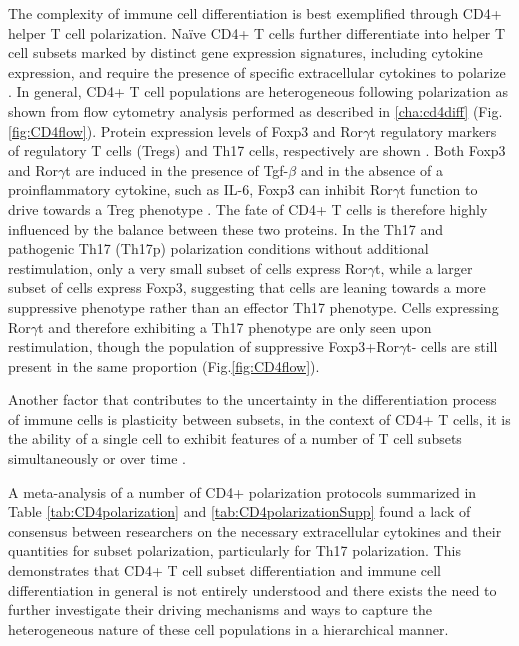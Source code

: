 The complexity of immune cell differentiation is best exemplified through CD4+ helper T cell polarization. Naïve CD4+ T cells further differentiate into helper T cell subsets marked by distinct gene expression signatures, including cytokine expression, and require the presence of specific extracellular cytokines to polarize \cite{Zhang_2012}. In general, CD4+ T cell populations are heterogeneous following polarization as shown from flow cytometry analysis performed as described in \ref{cha:cd4diff} (Fig. \ref{fig:CD4flow}). Protein expression levels of Foxp3 and Ror$\gamma$t \textemdash regulatory markers of regulatory T cells (Tregs) and Th17 cells, respectively \textemdash are shown \cite{Rudensky_2011, Ivanov_2006}. Both Foxp3 and Ror$\gamma$t are induced in the presence of Tgf-$\beta$ and in the absence of a proinflammatory cytokine, such as IL-6, Foxp3 can inhibit Ror$\gamma$t function to drive towards a Treg phenotype \cite{Ziegler_2009}. The fate of CD4+ T cells is therefore highly influenced by the balance between these two proteins. In the Th17 and pathogenic Th17 (Th17p) polarization conditions without additional restimulation, only a very small subset of cells express Ror$\gamma$t, while a larger subset of cells express Foxp3, suggesting that cells are leaning towards a more suppressive phenotype rather than an effector Th17 phenotype. Cells expressing Ror$\gamma$t and therefore exhibiting a Th17 phenotype are only seen upon restimulation, though the population of suppressive Foxp3+Ror$\gamma$t- cells are still present in the same proportion (Fig.\ref{fig:CD4flow}).

Another factor that contributes to the uncertainty in the differentiation process of immune cells is plasticity between subsets, in the context of CD4+ T cells, it is the ability of a single cell to exhibit features of a number of T cell subsets simultaneously or over time \cite{Geginat_2014}.

A meta-analysis of a number of CD4+ polarization protocols summarized in Table \ref{tab:CD4polarization} and \ref{tab:CD4polarizationSupp} found a lack of consensus between researchers on the necessary extracellular cytokines and their quantities for subset polarization, particularly for Th17 polarization. This demonstrates that CD4+ T cell subset differentiation and immune cell differentiation in general is not entirely understood and there exists the need to further investigate their driving mechanisms and ways to capture the heterogeneous nature of these cell populations in a hierarchical manner. 

